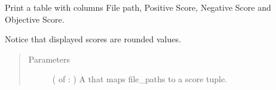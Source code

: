 \documentclass[letterpaper,10pt,english]{sphinxmanual}
\begin{document}
\begin{fulllineitems}
\label{\detokenize{utils:loacore.utils.plot_polarities.print_polarity_table}}
Print a table with columns File path, Positive Score, Negative Score and Objective Score.

Notice that displayed scores are rounded values.
\begin{quote}\begin{description}
\item[{Parameters}] \leavevmode
{} ( of  : ) \textendash{} A  that maps file\_paths to a score tuple.

\end{description}\end{quote}

\end{fulllineitems}

\end{document}
